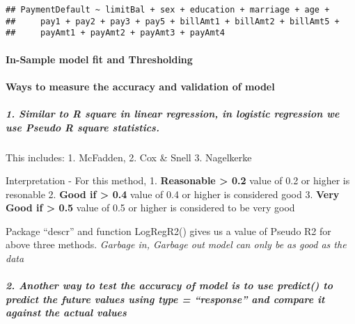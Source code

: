 \documentclass[
]{article}
\begin{document}
\begin{verbatim}
## PaymentDefault ~ limitBal + sex + education + marriage + age + 
##     pay1 + pay2 + pay3 + pay5 + billAmt1 + billAmt2 + billAmt5 + 
##     payAmt1 + payAmt2 + payAmt3 + payAmt4
\end{verbatim}

\hypertarget{in-sample-model-fit-and-thresholding}{%
\paragraph{In-Sample model fit and
Thresholding}\label{in-sample-model-fit-and-thresholding}}

\hypertarget{ways-to-measure-the-accuracy-and-validation-of-model}{%
\paragraph{Ways to measure the accuracy and validation of
model}\label{ways-to-measure-the-accuracy-and-validation-of-model}}

\hypertarget{similar-to-r-square-in-linear-regression-in-logistic-regression-we-use-pseudo-r-square-statistics.}{%
\subparagraph{1. Similar to R square in linear regression, in logistic
regression we use Pseudo R square
statistics.}\label{similar-to-r-square-in-linear-regression-in-logistic-regression-we-use-pseudo-r-square-statistics.}}

This includes: 1. McFadden, 2. Cox \& Snell 3. Nagelkerke

Interpretation - For this method, 1. \textbf{Reasonable \textgreater{}
0.2} value of 0.2 or higher is resonable 2. \textbf{Good if
\textgreater{} 0.4} value of 0.4 or higher is considered good 3.
\textbf{Very Good if \textgreater{} 0.5} value of 0.5 or higher is
considered to be very good

Package ``descr'' and function LogRegR2() gives us a value of Pseudo R2
for above three methods. \emph{Garbage in, Garbage out} \emph{model can
only be as good as the data}

\hypertarget{another-way-to-test-the-accuracy-of-model-is-to-use-predict-to-predict-the-future-values-using-type-response-and-compare-it-against-the-actual-values}{%
\subparagraph{2. Another way to test the accuracy of model is to use
predict() to predict the future values using type = ``response'' and
compare it against the actual
values}\label{another-way-to-test-the-accuracy-of-model-is-to-use-predict-to-predict-the-future-values-using-type-response-and-compare-it-against-the-actual-values}}
\end{document}

